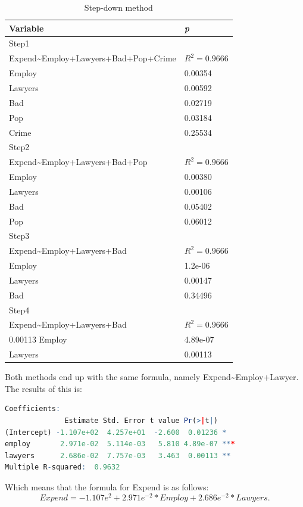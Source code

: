 \documentclass{article}
\begin{document}
    \begin{table}
    \begin{center}
    \begin{tabular}{|ll|}
        \hline
        Variable & \textit{p} \\
        \hline 
        Step1&\\
        \hline
        Expend\textasciitilde Employ+Lawyers+Bad+Pop+Crime & $R^2 = 0.9666$ \\
        Employ & 0.00354 \\
        Lawyers & 0.00592 \\
        Bad & 0.02719 \\
        Pop & 0.03184 \\
        Crime & 0.25534\\
        \hline
        Step2&\\
        \hline 
        Expend\textasciitilde Employ+Lawyers+Bad+Pop & $R^2 = 0.9666$ \\
        Employ & 0.00380 \\
        Lawyers & 0.00106 \\
        Bad & 0.05402 \\
        Pop & 0.06012 \\
        \hline
        Step3&\\
        \hline 
        Expend\textasciitilde Employ+Lawyers+Bad & $R^2 = 0.9666$ \\
        Employ & 1.2e-06 \\
        Lawyers & 0.00147 \\
        Bad & 0.34496 \\
        \hline
        Step4&\\
        \hline 
        Expend\textasciitilde Employ+Lawyers+Bad & $R^2 = 0.9666$ \\0.00113
        Employ & 4.89e-07 \\
        Lawyers & 0.00113 \\
        \hline
    \end{tabular}
    \caption{Step-down method}
    \label{table:step-down}
    \end{center}
    \end{table}
    Both methods end up with the same formula, namely Expend\textasciitilde Employ+Lawyer.
    The results of this is:
    \begin{lstlisting}[language=R]
Coefficients:
              Estimate Std. Error t value Pr(>|t|)    
(Intercept) -1.107e+02  4.257e+01  -2.600  0.01236 *  
employ       2.971e-02  5.114e-03   5.810 4.89e-07 ***
lawyers      2.686e-02  7.757e-03   3.463  0.00113 ** 
Multiple R-squared:  0.9632
    \end{lstlisting}
    Which means that the formula for Expend is as follows:
    \[
      Expend = -1.107e^2 + 2.971e^{-2} * Employ + 2.686e^{-2} * Lawyers.
    \]
    \\
\end{document}

